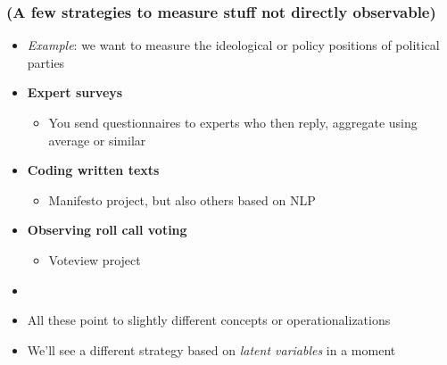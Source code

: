 \documentclass[aspectratio=43]{beamer}
\begin{document}
\begin{frame}
\frametitle{(A few strategies to measure stuff not directly observable)}
\centering

\begin{itemize}
  \item<2->[] \textit{Example}: we want to measure the ideological or policy positions of political parties
  \item<3-> \textbf{Expert surveys}
  \begin{itemize}
    \item You send questionnaires to experts who then reply, aggregate using average or similar
  \end{itemize}
  \item<4-> \textbf{Coding written texts}
  \begin{itemize}
    \item Manifesto project, but also others based on NLP
  \end{itemize}
  \item<5-> \textbf{Observing roll call voting}
  \begin{itemize}
    \item Voteview project
  \end{itemize}
  \item[]
  \item<5-> All these point to slightly different concepts or operationalizations
  \item<5-> We'll see a different strategy based on \textit{latent variables} in a moment
\end{itemize}

\end{frame}
\end{document}
